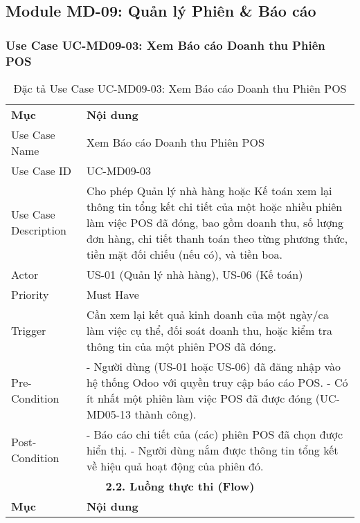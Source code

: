 \subsection{Module MD-09: Quản lý Phiên \& Báo cáo}

\subsubsection{Use Case UC-MD09-03: Xem Báo cáo Doanh thu Phiên POS}

\begin{longtable}{|m{4cm}|p{11cm}|}
\caption{Đặc tả Use Case UC-MD09-03: Xem Báo cáo Doanh thu Phiên POS} \label{tab:uc_md09_03} \\
\hline

\endhead %
\hline
\endfoot %
\hline
\endlastfoot %
\multicolumn{2}{|c|}{\textbf{2.1. Tóm tắt (Summary)}} \\
\hline
\textbf{Mục} & \textbf{Nội dung} \\
\hline
Use Case Name & Xem Báo cáo Doanh thu Phiên POS \\
\hline
Use Case ID & UC-MD09-03 \\
\hline
Use Case Description & Cho phép Quản lý nhà hàng hoặc Kế toán xem lại thông tin tổng kết chi tiết của một hoặc nhiều phiên làm việc POS đã đóng, bao gồm doanh thu, số lượng đơn hàng, chi tiết thanh toán theo từng phương thức, tiền mặt đối chiếu (nếu có), và tiền boa. \\
\hline
Actor & US-01 (Quản lý nhà hàng), US-06 (Kế toán) \\
\hline
Priority & Must Have \\
\hline
Trigger & Cần xem lại kết quả kinh doanh của một ngày/ca làm việc cụ thể, đối soát doanh thu, hoặc kiểm tra thông tin của một phiên POS đã đóng. \\
\hline
Pre-Condition & - Người dùng (US-01 hoặc US-06) đã đăng nhập vào hệ thống Odoo với quyền truy cập báo cáo POS. \newline - Có ít nhất một phiên làm việc POS đã được đóng (UC-MD05-13 thành công). \\
\hline
Post-Condition & - Báo cáo chi tiết của (các) phiên POS đã chọn được hiển thị. \newline - Người dùng nắm được thông tin tổng kết về hiệu quả hoạt động của phiên đó. \\
\hline
\multicolumn{2}{|c|}{\textbf{2.2. Luồng thực thi (Flow)}} \\
\hline
\textbf{Mục} & \textbf{Nội dung} \\

\end{longtable}
